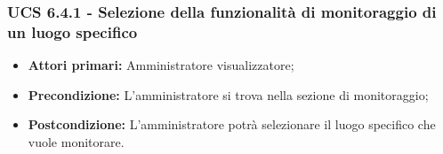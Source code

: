 \subsubsection{UCS 6.4.1 - Selezione della funzionalità di monitoraggio di un luogo specifico}
\begin{itemize}
	\item \textbf{Attori primari:} Amministratore visualizzatore;
	\item \textbf{Precondizione:} L'amministratore si trova nella sezione di monitoraggio;
	\item \textbf{Postcondizione:} L'amministratore potrà selezionare il luogo specifico che vuole monitorare.
\end{itemize}



